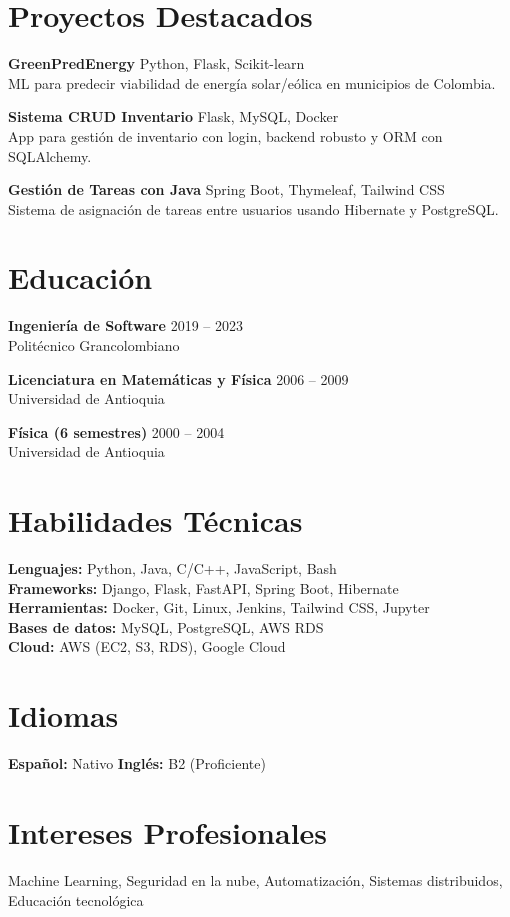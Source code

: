 \documentclass[a4paper,10pt]{article}
\begin{document}
	\section*{Proyectos Destacados}
	\textbf{GreenPredEnergy} \hfill Python, Flask, Scikit-learn \\
	ML para predecir viabilidad de energía solar/eólica en municipios de Colombia.
	
	\textbf{Sistema CRUD Inventario} \hfill Flask, MySQL, Docker \\
	App para gestión de inventario con login, backend robusto y ORM con SQLAlchemy.
	
	\textbf{Gestión de Tareas con Java} \hfill Spring Boot, Thymeleaf, Tailwind CSS \\
	Sistema de asignación de tareas entre usuarios usando Hibernate y PostgreSQL.
	
	\section*{Educación}
	\textbf{Ingeniería de Software} \hfill 2019 -- 2023 \\
	Politécnico Grancolombiano
	
	\textbf{Licenciatura en Matemáticas y Física} \hfill 2006 -- 2009 \\
	Universidad de Antioquia
	
	\textbf{Física (6 semestres)} \hfill 2000 -- 2004 \\
	Universidad de Antioquia
	
	\section*{Habilidades Técnicas}
	\textbf{Lenguajes:} Python, Java, C/C++, JavaScript, Bash \\
	\textbf{Frameworks:} Django, Flask, FastAPI, Spring Boot, Hibernate \\
	\textbf{Herramientas:} Docker, Git, Linux, Jenkins, Tailwind CSS, Jupyter \\
	\textbf{Bases de datos:} MySQL, PostgreSQL, AWS RDS \\
	\textbf{Cloud:} AWS (EC2, S3, RDS), Google Cloud
	
	\section*{Idiomas}
	\textbf{Español:} Nativo \quad \textbf{Inglés:} B2 (Proficiente)
	
	\section*{Intereses Profesionales}
	Machine Learning, Seguridad en la nube, Automatización, Sistemas distribuidos, Educación tecnológica
	
\end{document}
